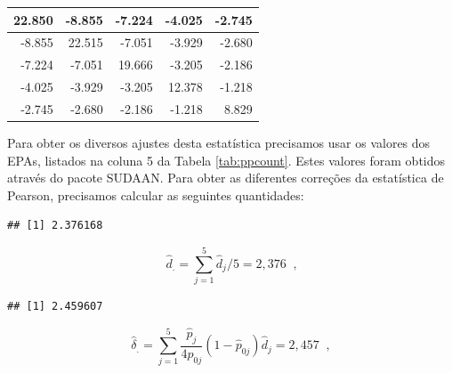 \documentclass[]{book}
\newenvironment{Shaded}{\begin{snugshade}}{\end{snugshade}}
\newcommand{\KeywordTok}[1]{\textcolor[rgb]{0.13,0.29,0.53}{\textbf{#1}}}
\newcommand{\DecValTok}[1]{\textcolor[rgb]{0.00,0.00,0.81}{#1}}
\newcommand{\StringTok}[1]{\textcolor[rgb]{0.31,0.60,0.02}{#1}}
\newcommand{\OperatorTok}[1]{\textcolor[rgb]{0.81,0.36,0.00}{\textbf{#1}}}
\newcommand{\NormalTok}[1]{#1}
\theoremstyle{definition}
\theoremstyle{definition}
\theoremstyle{definition}
\theoremstyle{remark}
\begin{document}
\begin{tabular}{r|r|r|r|r}
\hline
22.850 & -8.855 & -7.224 & -4.025 & -2.745\\
\hline
-8.855 & 22.515 & -7.051 & -3.929 & -2.680\\
\hline
-7.224 & -7.051 & 19.666 & -3.205 & -2.186\\
\hline
-4.025 & -3.929 & -3.205 & 12.378 & -1.218\\
\hline
-2.745 & -2.680 & -2.186 & -1.218 & 8.829\\
\hline
\end{tabular}

Para obter os diversos ajustes desta estatística precisamos usar os
valores dos EPAs, listados na coluna 5 da Tabela \ref{tab:ppcount}.
Estes valores foram obtidos através do pacote SUDAAN. Para obter as
diferentes correções da estatística de Pearson, precisamos calcular as
seguintes quantidades:

\begin{Shaded}
\end{Shaded}

\begin{verbatim}
## [1] 2.376168
\end{verbatim}

\[
\hat{d}_{.}=\sum_{j=1}^{5}\hat{d}_{j}/5=2,376\;\;\mbox{,} 
\]

\begin{Shaded}
\end{Shaded}

\begin{verbatim}
## [1] 2.459607
\end{verbatim}

\[
\hat{\delta}_{.}=\sum_{j=1}^5\frac{\hat{p}_{j}}{4p_{0j}}
\left( 1-\hat{p}_{0j}\right) \hat{d}_{j}=2,457\;\;, 
\]
\end{document}
